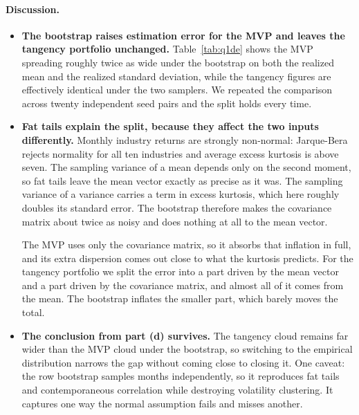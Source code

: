 \documentclass[11pt]{article}
\begin{document}
\paragraph{Discussion.}
\begin{itemize}
\setlength{\itemsep}{3pt}\setlength{\parskip}{0pt}

\item \textbf{The bootstrap raises estimation error for the MVP and leaves the
tangency portfolio unchanged.} Table~\ref{tab:q1de} shows the MVP spreading
roughly twice as wide under the bootstrap on both the realized mean and the
realized standard deviation, while the tangency figures are effectively
identical under the two samplers. We repeated the comparison across twenty
independent seed pairs and the split holds every time.

\item \textbf{Fat tails explain the split, because they affect the two inputs
differently.} Monthly industry returns are strongly non-normal: Jarque-Bera
rejects normality for all ten industries and average excess kurtosis is above
seven. The sampling variance of a mean depends only on the second moment, so
fat tails leave the mean vector exactly as precise as it was. The sampling
variance of a variance carries a term in excess kurtosis, which here roughly
doubles its standard error. The bootstrap therefore makes the covariance
matrix about twice as noisy and does nothing at all to the mean vector.

The MVP uses only the covariance matrix, so it absorbs that inflation in full,
and its extra dispersion comes out close to what the kurtosis predicts. For
the tangency portfolio we split the error into a part driven by the mean
vector and a part driven by the covariance matrix, and almost all of it comes
from the mean. The bootstrap inflates the smaller part, which barely moves the
total.

\item \textbf{The conclusion from part (d) survives.} The tangency cloud
remains far wider than the MVP cloud under the bootstrap, so switching to the
empirical distribution narrows the gap without coming close to closing it. One
caveat: the row bootstrap samples months independently, so it reproduces fat
tails and contemporaneous correlation while destroying volatility clustering.
It captures one way the normal assumption fails and misses another.

\end{itemize}

\end{document}
